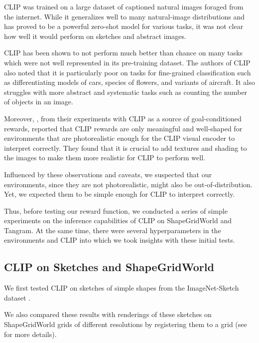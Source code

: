 CLIP was trained on a large dataset of captioned natural images foraged from the internet.
While it generalizes well to many natural-image distributions and has proved to be a powerful zero-shot model for various tasks, it was not clear how well it would perform on sketches and abstract images. 

CLIP has been shown to not perform much better than chance on many tasks which were not well represented in its pre-training dataset.
The authors of CLIP also noted that it is particularly poor on tasks for fine-grained classification such as differentiating models of cars, species of flowers, and variants of aircraft.
It also struggles with more abstract and systematic tasks such as counting the number of objects in an image.

Moreover, \cite{vlmrm}, from their experiments with CLIP as a source of goal-conditioned rewards, reported that CLIP rewards are only meaningful and well-shaped for environments that are photorealistic enough for the CLIP visual encoder to interpret correctly.
They found that it is crucial to add textures and shading to the images to make them more realistic for CLIP to perform well.

Influenced by these observations and caveats, we suspected that our environments, since they are not photorealistic, might also be out-of-distribution. 
Yet, we expected them to be simple enough for CLIP to interpret correctly.

Thus, before testing our reward function, we conducted a series of simple experiments on the inference capabilities of CLIP on ShapeGridWorld and Tangram.
At the same time, there were several hyperparameters in the environments and CLIP into which we took insights with these initial tests.


\subsection{CLIP on Sketches and ShapeGridWorld}
\label{sec:clip-sketches}

We first tested CLIP on sketches of simple shapes from the ImageNet-Sketch dataset \citep{imagenet}.

We also compared these results with renderings of these sketches on ShapeGridWorld grids of different resolutions by registering them to a grid (see  for more details).

